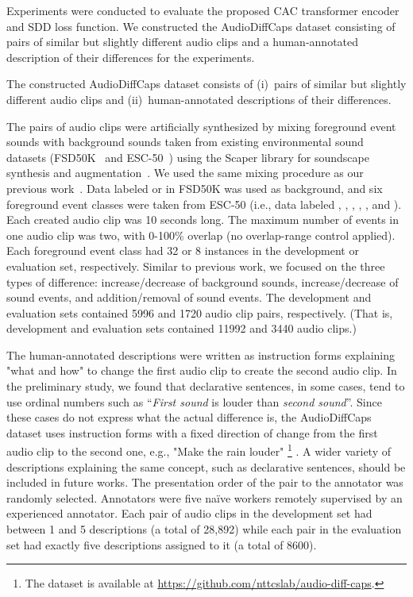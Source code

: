 Experiments were conducted to evaluate the proposed CAC transformer encoder and SDD loss function.
We constructed the AudioDiffCaps dataset consisting of pairs of similar but slightly different audio clips and a human-annotated description of their differences for the experiments.

The constructed AudioDiffCaps dataset consists of
(i)~pairs of similar but slightly different audio clips and (ii)~human-annotated descriptions of their differences.

The pairs of audio clips were artificially synthesized by mixing foreground event sounds with background sounds taken from existing environmental sound datasets (FSD50K~\cite{fonseca2020fsd50k} and ESC-50~\cite{piczak2015dataset}) using the Scaper library for soundscape synthesis and augmentation~\cite{salamon2017scaper}. We used the same mixing procedure as our previous work~\cite{takeuchi2022introducing}.
Data labeled  or  in FSD50K was used as background, and six foreground event classes were taken from ESC-50 (i.e., data labeled , , , , , and ).
Each created audio clip was 10 seconds long. The maximum number of events in one  audio clip was two, with 0-100\% overlap (no overlap-range control applied). 
Each foreground event class had 32 or 8 instances in the development or evaluation set, respectively. 
Similar to previous work, we focused on the three types of difference: increase/decrease of background sounds, increase/decrease of sound events, and addition/removal of sound events.
The development and evaluation sets contained 5996 and 1720 audio clip pairs, respectively. (That is, development and evaluation sets contained 11992 and 3440 audio clips.)

The human-annotated descriptions were written as instruction forms explaining "what and how" to change the first audio clip to create the second audio clip.
In the preliminary study, we found that declarative sentences, in some cases, tend to use ordinal numbers such as ``\textit{First sound} is louder than \textit{second sound}''. 
Since these cases do not express what the actual difference is, the AudioDiffCaps dataset uses instruction forms with a fixed direction of change from the first audio clip to the second one, e.g., "Make the rain louder"
\footnote{The dataset is available at \url{https://github.com/nttcslab/audio-diff-caps}.}
.
A wider variety of descriptions explaining the same concept, such as declarative sentences, should be included in future works.
The presentation order of the pair to the annotator was randomly selected.
Annotators were five na\"{i}ve workers remotely supervised by an experienced annotator.
Each pair of audio clips in the development set had between 1 and 5 descriptions (a total of 28,892) while each pair in the evaluation set had exactly five descriptions assigned to it (a total of 8600).

